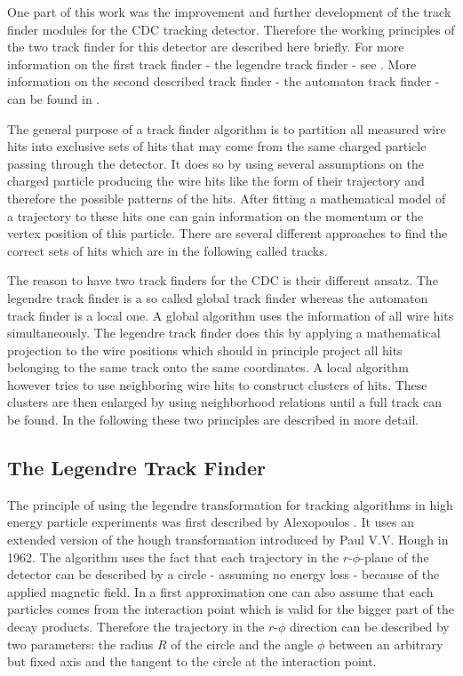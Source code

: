 One part of this work was the improvement and further development of the track finder modules for the CDC tracking detector. Therefore the working principles of the two track finder for this detector are described here briefly. For more information on the first track finder - the legendre track finder - see \cite{kronenbitter}. More information on the second described track finder - the automaton track finder - can be found in \cite{oliver}.

The general purpose of a track finder algorithm is to partition all measured wire hits into exclusive sets of hits that may come from the same charged particle passing through the detector. It does so by using several assumptions on the charged particle producing the wire hits like the form of their trajectory and therefore the possible patterns of the hits. After fitting a mathematical model of a trajectory to these hits one can gain information on the momentum or the vertex position of this particle. There are several different approaches to find the correct sets of hits which are in the following called tracks.

The reason to have two track finders for the CDC is their different ansatz. The legendre track finder is a so called global track finder whereas the automaton track finder is a local one. A global algorithm uses the information of all wire hits simultaneously. The legendre track finder does this by applying a mathematical projection to the wire positions which should in principle project all hits belonging to the same track onto the same coordinates. A local algorithm however tries to use neighboring wire hits to construct clusters of hits. These clusters are then enlarged by using neighborhood relations until a full track can be found. In the following these two principles are described in more detail.

\subsection{The Legendre Track Finder}
The principle of using the legendre transformation for tracking algorithms in high energy particle experiments was first described by Alexopoulos \cite{legendre}. It uses an extended version of the hough transformation introduced by Paul V.V. Hough in 1962. The algorithm uses the fact that each trajectory in the $r$-$\phi$-plane of the detector can be described by a circle - assuming no energy loss - because of the applied magnetic field. In a first approximation one can also assume that each particles comes from the interaction point which is valid for the bigger part of the decay products. Therefore the trajectory in the $r$-$\phi$ direction can be described by two parameters: the radius $R$ of the circle and the angle $\phi$ between an arbitrary but fixed axis and the tangent to the circle at the interaction point.

